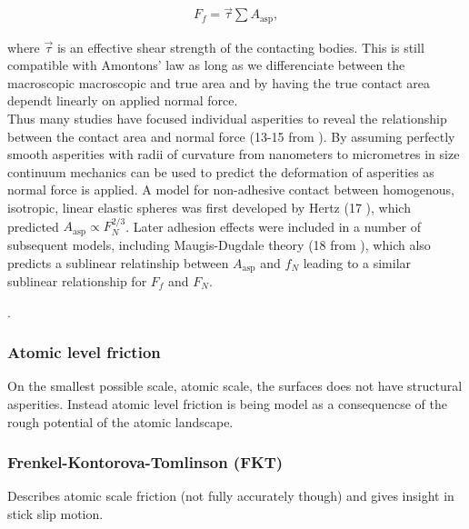 \begin{align*}
  F_f = \vec{\tau} \sum A_{\text{asp}},
\end{align*}

where $\vec{\tau}$ is an effective shear strength of the contacting bodies. This is still compatible with Amontons’ law as long as we
differenciate between the macroscopic macroscopic and true area and by having the true contact area dependt linearly on applied normal
force. \\

Thus many studies have focused individual asperities to reveal the relationship between the contact area and normal force  (13-15 from
\cite{mo_friction_2009}). By assuming perfectly smooth asperities with radii of curvature from nanometers to micrometres in size continuum
mechanics can be used to predict the deformation of asperities as normal force is applied. A model for non-adhesive contact between
homogenous, isotropic, linear elastic spheres was first developed by Hertz (17 \cite{mo_friction_2009}), which predicted $A_{\text{asp}}
\propto F_N^{2/3}$. Later adhesion effects were included in a number of subsequent models, including Maugis-Dugdale theory (18 from
\cite{mo_friction_2009}), which also predicts a sublinear relatinship between $A_{\text{asp}}$ and $f_N$ leading to a similar sublinear
relationship for $F_f$ and $F_N$.

\cite{mo_friction_2009}.




\subsubsection{Atomic level friction }
On the smallest possible scale, atomic scale, the surfaces does not have structural asperities. Instead atomic level friction is being model
as a consequencse of the rough potential of the atomic landscape. 

\subsubsection{Frenkel-Kontorova-Tomlinson (FKT)}
Describes atomic scale friction (not fully accurately though) and gives insight in stick slip motion. 



